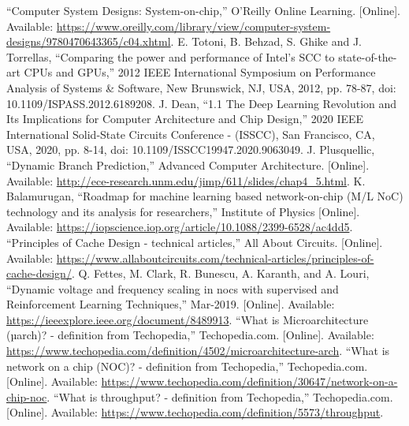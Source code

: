 \documentclass[conference]{IEEEtran}
\begin{document}
\begin{thebibliography}{00}
     ``Computer System Designs: System-on-chip,'' O'Reilly Online Learning. [Online]. Available: \url{https://www.oreilly.com/library/view/computer-system-designs/9780470643365/c04.xhtml}.
     E. Totoni, B. Behzad, S. Ghike and J. Torrellas, ``Comparing the power and performance of Intel's SCC to state-of-the-art CPUs and GPUs,'' 2012 IEEE International Symposium on Performance Analysis of Systems \& Software, New Brunswick, NJ, USA, 2012, pp. 78-87, doi: 10.1109/ISPASS.2012.6189208.
     J. Dean, ``1.1 The Deep Learning Revolution and Its Implications for Computer Architecture and Chip Design,'' 2020 IEEE International Solid-State Circuits Conference - (ISSCC), San Francisco, CA, USA, 2020, pp. 8-14, doi: 10.1109/ISSCC19947.2020.9063049.
     J. Plusquellic, ``Dynamic Branch Prediction,'' Advanced Computer Architecture. [Online]. Available: \url{http://ece-research.unm.edu/jimp/611/slides/chap4_5.html}.
     K. Balamurugan, ``Roadmap for machine learning based network-on-chip (M/L NoC) technology and its analysis for researchers,'' Institute of Physics [Online]. Available: \url{https://iopscience.iop.org/article/10.1088/2399-6528/ac4dd5}. 
     ``Principles of Cache Design - technical articles,'' All About Circuits. [Online]. Available: \url{https://www.allaboutcircuits.com/technical-articles/principles-of-cache-design/}.
     Q. Fettes, M. Clark, R. Bunescu, A. Karanth, and A. Louri, ``Dynamic voltage and frequency scaling in nocs with supervised and Reinforcement Learning Techniques,'' Mar-2019. [Online]. Available: \url{https://ieeexplore.ieee.org/document/8489913}. 
     ``What is Microarchitecture (µarch)? - definition from Techopedia,'' Techopedia.com. [Online]. Available: \url{https://www.techopedia.com/definition/4502/microarchitecture-arch}.
     ``What is network on a chip (NOC)? - definition from Techopedia,'' Techopedia.com. [Online]. Available: \url{https://www.techopedia.com/definition/30647/network-on-a-chip-noc}.
     ``What is throughput? - definition from Techopedia,'' Techopedia.com. [Online]. Available: \url{https://www.techopedia.com/definition/5573/throughput}. 
\end{thebibliography}
\end{document}
